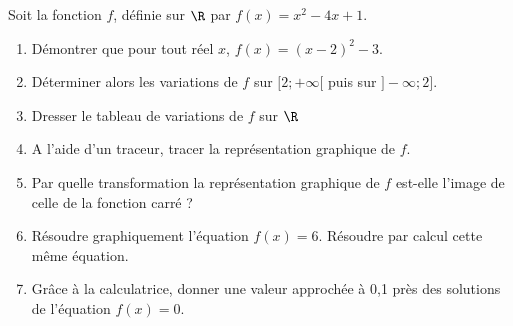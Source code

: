 
Soit la fonction $f$, définie sur $\R$ par $f (x) = x^2 - 4x +1$.
\begin{enumerate}
\item Démontrer que pour tout réel $x$, $f(x)=(x-2)^2-3$.
\item  Déterminer alors les variations de $f$ sur $[2;+\infty     [$  puis sur $]-\infty;2]$.
\item  Dresser le tableau de variations de $f$ sur $\R$
\item A l'aide d'un traceur, tracer la représentation graphique de $f$.
\item Par quelle transformation la représentation graphique de $f$ est-elle l'image de celle de la fonction carré ?
\item  Résoudre graphiquement l'équation $f(x) = 6$. Résoudre par calcul cette même équation.
\item  Grâce à la calculatrice, donner une valeur approchée à 0,1 près des solutions de l'équation $f(x)=0$.
 \end{enumerate}